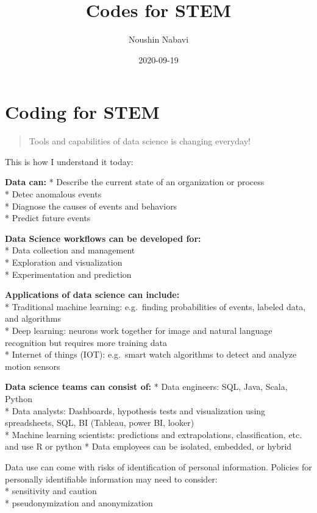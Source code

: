 \documentclass[]{book}
\title{Codes for STEM}
\author{Noushin Nabavi}
\date{2020-09-19}
\begin{document}
\maketitle

{
\setcounter{tocdepth}{1}
\tableofcontents
}
\hypertarget{coding-for-stem}{%
\chapter{Coding for STEM}\label{coding-for-stem}}

\begin{quote}
Tools and capabilities of data science is changing everyday!
\end{quote}

This is how I understand it today:

\textbf{Data can:}
* Describe the current state of an organization or process\\
* Detec anomalous events\\
* Diagnose the causes of events and behaviors\\
* Predict future events

\textbf{Data Science workflows can be developed for: }\\
* Data collection and management\\
* Exploration and visualization\\
* Experimentation and prediction

\textbf{Applications of data science can include: }\\
* Traditional machine learning: e.g.~finding probabilities of events, labeled data, and algorithms\\
* Deep learning: neurons work together for image and natural language recognition but requires more training data\\
* Internet of things (IOT): e.g.~smart watch algorithms to detect and analyze motion sensors

\textbf{Data science teams can consist of:}
* Data engineers: SQL, Java, Scala, Python\\
* Data analysts: Dashboards, hypothesis tests and visualization using spreadsheets, SQL, BI (Tableau, power BI, looker)\\
* Machine learning scientists: predictions and extrapolations, classification, etc. and use R or python * Data employees can be isolated, embedded, or hybrid

Data use can come with risks of identification of personal information. Policies for personally identifiable information may need to consider:\\
* sensitivity and caution\\
* pseudonymization and anonymization
\end{document}
